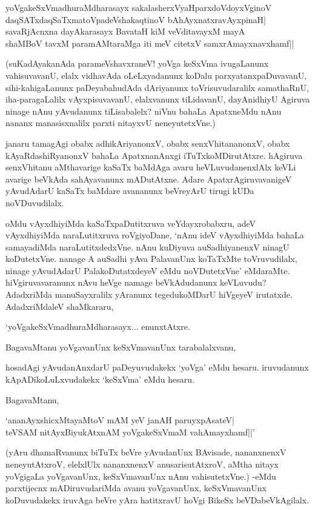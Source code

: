 \begin{shloka}
yoVgakeSxVmadhuraMdharasayx sakalasherxVyaHparxdoVdoyxVginoV\\
daqSATxdaqSaTxmatoVpadeVshakaqtinoV bAhAyxnatxravAyxpinaH|\\
savaRjAcnxna dayAkarasayx BavataH kiM veVditavayxM mayA\\
shaMBoV tavxM paramAMtaraMga iti meV citetxV samxrAmayxnavxhamf||
\end{shloka}

(suKadAyakanAda parameVshavxraneV! yoVga keSxVma ivugaLanunx vahisuvavanU, elalx vidhavAda oLeLxyadanunx koDalu parxyatanxpaDuvavanU, sihi-kahigaLanunx paDeyabahudAda dAriyanunx toVrisuvudaralilx samathaRnU, iha-paragaLalilx vAyxpisuvavanU, elalxvanunx tiLidavanU, dayAnidhiyU Agiruva ninage nAnu yAvudanunx tiLisabalelx? niVnu bahaLa ApatxneMdu nAnu nananx manasisxnalilx parxti nitayxvU neneyutetxVne.)

janaru tamagAgi obabx adhikAriyanonxV, obabx senxVhitananonxV, obabx kAyaRdashiRyanonxV bahaLa ApatxnanAnxgi iTuTxkoMDirutAtxre. hAgiruva senxVhitanu aMthavarige kaSaTx baMdAga avaru heVLuvudanenxlAlx keVLi avarige beVkAda sahAyavanunx mADutAtxne. Adare ApatxrAgiruvavanigeV yAvudAdarU kaSaTx baMdare avananunx beVreyArU tirugi kUDa noVDuvudilalx.

oMdu vAyxdhiyiMda kaSaTxpaDutitxruva veYdayxrobabxru, adeV vAyxdhiyiMda naraLutitxruva roVgiyoDane, `nAnu ideV vAyxdhiyiMda bahaLa samayadiMda naraLutitxdedxVne. nAnu kuDiyuva auSadhiyanenxV ninagU koDutetxVne. nanage A auSadhi yAva PalavanUnx koTaTxMte toVruvudilalx, ninage yAvudAdarU PalakoDutatxdeyeV eMdu noVDutetxVne' eMdaraMte. hiVgiruvavaranunx nAvu heVge namage beVkAdudanunx keVLuvudu? AdadxriMda manuSayxralilx yAranunx tegedukoMDarU hiVgeyeV irutatxde. AdadxriMdaleV shaMkararu,

`yoVgakeSxVmadhuraMdharasayx$\ldots$ enunxtAtxre.

BagavaMtanu yoVgavanUnx keSxVmavanUnx tarabalalxvanu,

hosadAgi yAvudanAnxdarU paDeyuvudakekx `yoVga' eMdu hesaru. iruvudanunx kApADikoLuLxvudakekx `keSxVma' eMdu hesaru.

BagavaMtanu,

\begin{shloka}
`ananAyxshicxMtayaMtoV mAM yeV janAH paruyxpAsateV|\\
teVSAM nitAyxBiyukAtxnAM yoVgakeSxVmaM vahAmayxhamf||'
\end{shloka}

(yAru dhamaRvanunx biTuTx beVre yAvudanUnx BAvisade, nananxnenxV neneyutAtxroV, elelxlUlx nananxnenxV anusarisutAtxroV, aMtha nitayx yoVgigaLa yoVgavanUnx, keSxVmavanUnx nAnu vahisutetxVne.) -eMdu parxtijecnx mADiruvudariMda avanu yoVgavanUnx, keSxVmavanUnx koDuvudakekx iruvAga beVre yAra hatitxravU hoVgi BikeSx beVDabeVkAgilalx.

